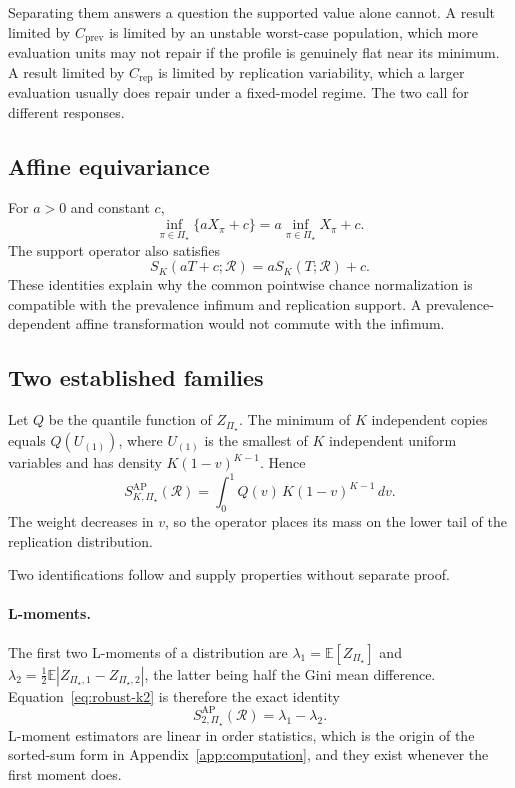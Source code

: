 \documentclass[11pt]{article}
\newcommand{\Regime}{\mathcal{R}}
\newcommand{\PSet}{\Pi_\star}
\newcommand{\E}{\mathbb{E}}
\theoremstyle{remark}
\begin{document}
Separating them answers a question the supported value alone cannot. A result limited by $C_{\mathrm{prev}}$ is limited by an unstable worst-case population, which more evaluation units may not repair if the profile is genuinely flat near its minimum. A result limited by $C_{\mathrm{rep}}$ is limited by replication variability, which a larger evaluation usually does repair under a fixed-model regime. The two call for different responses.

\subsection{Affine equivariance}

For $a>0$ and constant $c$,
\[
\inf_{\pi\in\PSet}\{aX_\pi+c\}
=
a\inf_{\pi\in\PSet}X_\pi+c.
\]
The support operator also satisfies
\[
S_K(aT+c;\Regime)
=
aS_K(T;\Regime)+c.
\]
These identities explain why the common pointwise chance normalization is compatible with the prevalence infimum and replication support. A prevalence-dependent affine transformation would not commute with the infimum.

\subsection{Two established families}
\label{app:families}

Let $Q$ be the quantile function of $Z_{\PSet}$. The minimum of $K$ independent copies equals $Q(U_{(1)})$, where $U_{(1)}$ is the smallest of $K$ independent uniform variables and has density $K(1-v)^{K-1}$. Hence
\begin{equation}
S_{K,\PSet}^{\mathrm{AP}}(\Regime)
=
\int_0^1
Q(v)\,K(1-v)^{K-1}\,dv.
\label{eq:quantile-weight}
\end{equation}
The weight decreases in $v$, so the operator places its mass on the lower tail of the replication distribution.

Two identifications follow and supply properties without separate proof.

\paragraph{L-moments.}
The first two L-moments of a distribution \cite{hosking1990lmoments} are $\lambda_1=\E[Z_{\PSet}]$ and $\lambda_2=\tfrac12\E|Z_{\PSet,1}-Z_{\PSet,2}|$, the latter being half the Gini mean difference. Equation~\eqref{eq:robust-k2} is therefore the exact identity
\[
S_{2,\PSet}^{\mathrm{AP}}(\Regime)
=
\lambda_1-\lambda_2 .
\]
L-moment estimators are linear in order statistics, which is the origin of the sorted-sum form in Appendix~\ref{app:computation}, and they exist whenever the first moment does.
\end{document}
